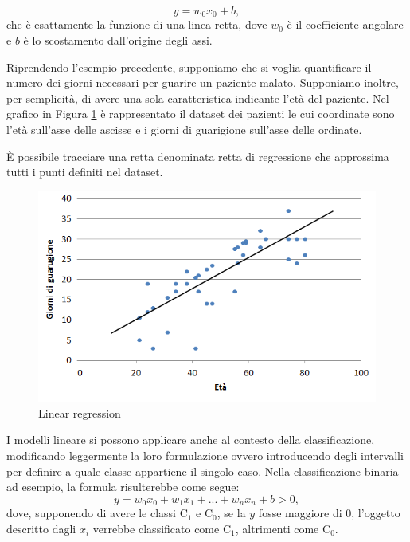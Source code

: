\documentclass[12pt,italian]{report}
\begin{document}
\[ y = w_{0}x_{0} + b,\]
che è esattamente la funzione di una linea retta, dove $ w_{0}$ è il coefficiente angolare e $ b $ è lo scostamento dall'origine degli assi.

Riprendendo l'esempio precedente, supponiamo che si voglia quantificare il numero dei giorni necessari per guarire un paziente malato.
Supponiamo inoltre, per semplicità, di avere una sola caratteristica indicante l'età del paziente.
Nel grafico in Figura \ref{fig:linear_regression} è rappresentato il dataset dei pazienti le cui coordinate sono l'età sull'asse delle ascisse e i giorni di guarigione sull'asse delle ordinate.

È possibile tracciare una retta denominata retta di regressione che approssima tutti i punti definiti nel dataset. 

\begin{figure}[h!]
	\center
	\includegraphics[scale=0.6]{../img/linear_regression}
	\caption{Linear regression}
	\label{fig:linear_regression}
\end{figure}

I modelli lineare si possono applicare anche al contesto della classificazione, modificando leggermente la loro formulazione ovvero introducendo degli intervalli per definire a quale classe appartiene il singolo caso. Nella classificazione binaria ad esempio, la formula risulterebbe come segue:
\[ y = w_{0}x_{0} + w_{1}x_{1} + ... + w_{n}x_{n} + b > 0, \]
dove, supponendo di avere le classi $ \mathrm{C_1} $ e $ \mathrm{C_0} $, se la $ y $ fosse maggiore di $ 0 $, l'oggetto descritto dagli $x_{i}$ verrebbe classificato come $ \mathrm{C_1} $, altrimenti come $ \mathrm{C_0} $.
%
\end{document}
